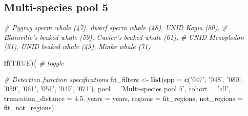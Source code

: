 \documentclass[
]{book}
\newenvironment{Shaded}{\begin{snugshade}}{\end{snugshade}}
\newcommand{\CommentTok}[1]{\textcolor[rgb]{0.56,0.35,0.01}{\textit{#1}}}
\newcommand{\ControlFlowTok}[1]{\textcolor[rgb]{0.13,0.29,0.53}{\textbf{#1}}}
\newcommand{\DataTypeTok}[1]{\textcolor[rgb]{0.13,0.29,0.53}{#1}}
\newcommand{\FloatTok}[1]{\textcolor[rgb]{0.00,0.00,0.81}{#1}}
\newcommand{\KeywordTok}[1]{\textcolor[rgb]{0.13,0.29,0.53}{\textbf{#1}}}
\newcommand{\NormalTok}[1]{#1}
\newcommand{\OtherTok}[1]{\textcolor[rgb]{0.56,0.35,0.01}{#1}}
\newcommand{\StringTok}[1]{\textcolor[rgb]{0.31,0.60,0.02}{#1}}
\begin{document}
\hypertarget{multi-species-pool-5-1}{%
\subsection*{Multi-species pool 5}\label{multi-species-pool-5-1}}

\begin{Shaded}
\begin{Highlighting}[]
\CommentTok{# Pygmy sperm whale (47), dwarf sperm whale (48), UNID Kogia (80),}
\CommentTok{# Blainville's beaked whale (59), Cuvier's beaked whale (61),}
\CommentTok{# UNID Mesoplodon (51), UNID beaked whale (49), Minke whale (71)}

\ControlFlowTok{if}\NormalTok{(}\OtherTok{TRUE}\NormalTok{)\{ }\CommentTok{# toggle}

  \CommentTok{# Detection function specifications}
\NormalTok{  fit_filters <-}
\StringTok{    }\KeywordTok{list}\NormalTok{(}\DataTypeTok{spp =} \KeywordTok{c}\NormalTok{(}\StringTok{'047'}\NormalTok{, }\StringTok{'048'}\NormalTok{, }\StringTok{'080'}\NormalTok{, }\StringTok{'059'}\NormalTok{, }\StringTok{'061'}\NormalTok{, }\StringTok{'051'}\NormalTok{, }\StringTok{'049'}\NormalTok{, }\StringTok{'071'}\NormalTok{),}
         \DataTypeTok{pool =} \StringTok{'Multi-species pool 5'}\NormalTok{,}
         \DataTypeTok{cohort =} \StringTok{'all'}\NormalTok{,}
         \DataTypeTok{truncation_distance =} \FloatTok{4.5}\NormalTok{,}
         \DataTypeTok{years =}\NormalTok{ years,}
         \DataTypeTok{regions =}\NormalTok{ fit_regions,}
         \DataTypeTok{not_regions =}\NormalTok{ fit_not_regions)}


\end{Highlighting}
\end{Shaded}
\end{document}
